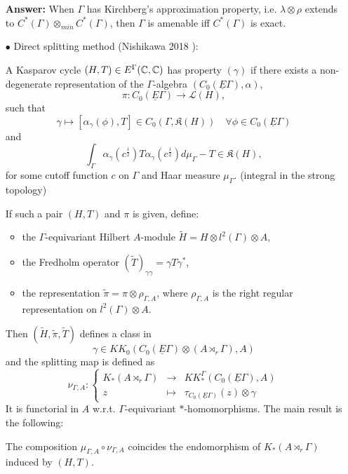 \begin{itemize}
\textbf{Answer:} When $\Gamma$ has Kirchberg's approximation property, i.e. $\lambda \otimes \rho$ extends to $C^*(\Gamma)\otimes_{min} C^*(\Gamma)$, then $\Gamma$ is amenable iff $C^*(\Gamma)$ is exact.\\
 
\item[$\bullet$] Direct splitting method (Nishikawa 2018 \cite{nishikawa2018direct}):\\

\begin{definition} A Kasparov cycle $(H,T)\in E^\Gamma(\mathbb C,\mathbb C)$ has property $(\gamma)$ if there exists a non-degenerate representation of the $\Gamma$-algebra $(C_0(\underline E \Gamma),\alpha)$,
\[\pi : C_0(\underline E \Gamma) \rightarrow \mathcal L(H),\]
such that
\[\gamma \mapsto [\alpha_\gamma(\phi ), T] \in C_0(\Gamma, \mathfrak K(H)) \quad\forall \phi \in C_0(\underline E\Gamma)\]
and 
\[\int_\Gamma \alpha_\gamma(c^\frac{1}{2}) T \alpha_\gamma(c^\frac{1}{2})d\mu_\Gamma - T\in \mathfrak K(H),\]
for some cutoff function $c$ on $\Gamma$ and Haar measure $\mu_\Gamma$. (integral in the strong topology)\\
\end{definition}

If such a pair $(H,T)$ and $\pi$ is given, define:\\

\begin{itemize}
\item the $\Gamma$-equivariant Hilbert $A$-module $\tilde H  = H\otimes l^2(\Gamma)\otimes A$,
\item the Fredholm operator $(\tilde T)_{\gamma\gamma} = \gamma T \gamma^*$,
\item the representation $\tilde \pi = \pi \otimes \rho_{\Gamma,A}$, where $\rho_{\Gamma,A}$ is the right regular representation on $l^2(\Gamma)\otimes A$.\\
\end{itemize}

Then $(\tilde H, \tilde \pi, \tilde T)$ defines a class in 
\[\gamma\in KK_0(C_0(\underline E\Gamma) \otimes (A\rtimes_r \Gamma), A)\] 
and the splitting map is defined as
\[\nu_{\Gamma,A} : \left\{ \begin{array}{rcl}
K_*(A\rtimes_r \Gamma) & \rightarrow & KK_*^\Gamma(C_0(\underline E \Gamma ), A) \\
z & \mapsto & \tau_{C_0(\underline E\Gamma)}(z)\otimes \gamma 
\end{array}\right.\]
It is functorial in $A$ w.r.t. $\Gamma$-equivariant $*$-homomorphisms. The main result is the following:\\

\begin{thm}
The composition $\mu_{\Gamma,A}\circ \nu_{\Gamma,A}$ coincides the endomorphism of $K_*(A\rtimes_r \Gamma)$ induced by $(H,T)$.
\end{thm}

\end{itemize}

